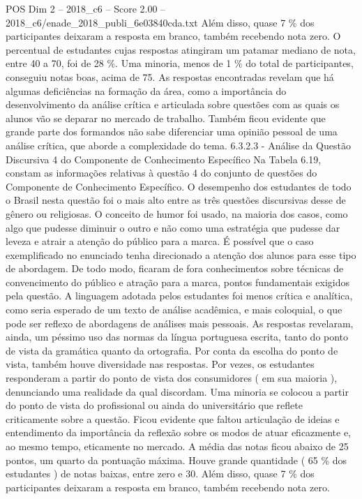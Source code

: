 \begin{textsample}{POS Dim 2 – 2018\_c6 – Score 2.00 – 2018\_c6/enade\_2018\_publi\_6e03840cda.txt}
Além disso, quase 7 \% dos participantes deixaram a resposta em branco, também recebendo nota zero.
O percentual de estudantes cujas respostas atingiram um patamar mediano de nota, entre 40 a 70, foi de 28 \%.
Uma minoria, menos de 1 \% do total de participantes, conseguiu notas boas, acima de 75.
As respostas encontradas revelam que há algumas deficiências na formação da área, como a importância do desenvolvimento da análise crítica e articulada sobre questões com as quais os alunos vão se deparar no mercado de trabalho.
Também ficou evidente que grande parte dos formandos não sabe diferenciar uma opinião pessoal de uma análise crítica, que aborde a complexidade do tema. 6.3.2.3 - Análise da Questão Discursiva 4 do Componente de Conhecimento Específico Na Tabela 6.19, constam as informações relativas à questão 4 do conjunto de questões do Componente de Conhecimento Específico.
O desempenho dos estudantes de todo o Brasil nesta questão foi o mais alto entre as três questões discursivas desse de gênero ou religiosas.
O conceito de humor foi usado, na maioria dos casos, como algo que pudesse diminuir o outro e não como uma estratégia que pudesse dar leveza e atrair a atenção do público para a marca.
É possível que o caso exemplificado no enunciado tenha direcionado a atenção dos alunos para esse tipo de abordagem.
De todo modo, ficaram de fora conhecimentos sobre técnicas de convencimento do público e atração para a marca, pontos fundamentais exigidos pela questão.
A linguagem adotada pelos estudantes foi menos crítica e analítica, como seria esperado de um texto de análise acadêmica, e mais coloquial, o que pode ser reflexo de abordagens de análises mais pessoais.
As respostas revelaram, ainda, um péssimo uso das normas da língua portuguesa escrita, tanto do ponto de vista da gramática quanto da ortografia.
Por conta da escolha do ponto de vista, também houve diversidade nas respostas.
Por vezes, os estudantes responderam a partir do ponto de vista dos consumidores ( em sua maioria ), denunciando uma realidade da qual discordam.
Uma minoria se colocou a partir do ponto de vista do profissional ou ainda do universitário que reflete criticamente sobre a questão.
Ficou evidente que faltou articulação de ideias e entendimento da importância da reflexão sobre os modos de atuar eficazmente e, ao mesmo tempo, eticamente no mercado.
A média das notas ficou abaixo de 25 pontos, um quarto da pontuação máxima.
Houve grande quantidade ( 65 \% dos estudantes ) de notas baixas, entre zero e 30.
Além disso, quase 7 \% dos participantes deixaram a resposta em branco, também recebendo nota zero.

\end{textsample}
